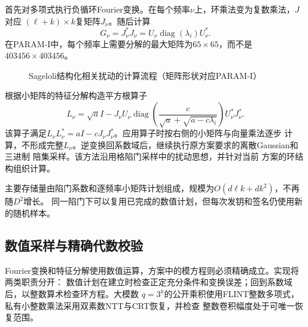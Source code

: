 首先对多项式执行负循环Fourier变换。在每个频率$\nu$上，环乘法变为复数乘法，$J$对应
$(\ell+k)\times k$复矩阵$J_\nu$。随后计算
\[
 G_\nu=J_\nu^*J_\nu
      =U_\nu\operatorname{diag}(\lambda_i)U_\nu^*.
\]
在PARAM-I中，每个频率上需要分解的最大矩阵为$65\times65$，而不是$403456\times403456$。

\begin{figure}[H]
\centering
{}
\caption{Sageloli结构化相关扰动的计算流程（矩阵形状对应PARAM-I）}
\label{fig:ring-sampler}
\end{figure}

根据小矩阵的特征分解构造平方根算子
\[
 L_\nu=\sqrt a I-
 J_\nu U_\nu\operatorname{diag}\!\left(
 \frac{c}{\sqrt a+\sqrt{a-c\lambda_i}}
 \right)U_\nu^*J_\nu^*.
\]
该算子满足$L_\nu L_\nu^*=aI-cJ_\nu J_\nu^*$。应用算子时按右侧的小矩阵与向量乘法逐步
计算，不形成完整$L_\nu$。逆变换回系数域后，继续执行原方案要求的离散Gaussian和三进制
陪集采样。该方法沿用格陷门采样中的扰动思想\cite{micciancio2012trapdoors}，并针对当前
方案的环结构组织计算。

主要存储量由陷门系数和逐频率小矩阵计划组成，规模为$O(d\ell k+dk^2)$，不再随$D^2$增长。
同一陷门下可以复用已完成的数值计划，但每次发钥和签名仍使用新的随机样本。

\subsection{数值采样与精确代数校验}

Fourier变换和特征分解使用数值运算，方案中的模方程则必须精确成立。实现将两类职责分开：
数值计划在建立时检查正定充分条件和变换误差；回到系数域后，以整数算术检查环方程。大模数
$q=3^k$的公开乘积使用FLINT整数多项式，私有小整数乘法采用双素数NTT与CRT恢复，并检查
整数卷积幅度处于可唯一恢复范围。

